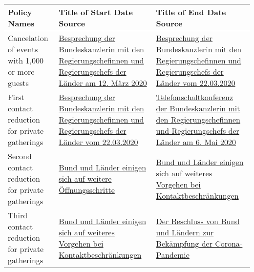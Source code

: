 \begin{table}[hbt!]
\centering
{
 \begin{tabular}{|| L | L | L ||}
 \hline
 \bf{Policy Names} &  \bf{Title of Start Date Source} &  \bf{Title of End Date Source} \\ [0.5ex]
 \hline\hline
 Cancelation of events with 1,000 or more guests & \href{https://www.bundesregierung.de/breg-de/themen/coronavirus/beschluss-zu-corona-1730292}{Besprechung der Bundeskanzlerin mit den Regierungschefinnen und Regierungschefs der Länder am 12. März 2020} & \href{https://www.bundesregierung.de/breg-de/themen/coronavirus/besprechung-der-bundeskanzlerin-mit-den-regierungschefinnen-und-regierungschefs-der-laender-vom-22-03-2020-1733248}{Besprechung der Bundeskanzlerin mit den Regierungschefinnen und Regierungschefs der Länder vom 22.03.2020}  \\

 First contact reduction for private gatherings & \href{https://www.bundesregierung.de/breg-de/themen/coronavirus/besprechung-der-bundeskanzlerin-mit-den-regierungschefinnen-und-regierungschefs-der-laender-vom-22-03-2020-1733248}{Besprechung der Bundeskanzlerin mit den Regierungschefinnen und Regierungschefs der Länder vom 22.03.2020} & \href{https://www.bundesregierung.de/resource/blob/992814/1750986/fc61b6eb1fc1d398d66cfea79b565129/2020-05-06-mpk-beschluss-data.pdf?download=1}{Telefonschaltkonferenz der Bundeskanzlerin mit den Regierungschefinnen und Regierungschefs der Länder am 6. Mai 2020}  \\

 Second contact reduction for private gatherings & \href{https://www.bundesregierung.de/breg-de/suche/bund-laender-beschluss-1750766}{Bund und Länder einigen sich auf weitere Öffnungsschritte} & \href{https://www.bundesregierung.de/breg-de/suche/bund-und-laender-einigen-sich-auf-weiteres-vorgehen-bei-kontaktbeschraenkungen-1755466}{Bund und Länder einigen sich auf weiteres Vorgehen bei Kontaktbeschränkungen}  \\

 Third contact reduction for private gatherings & \href{https://www.bundesregierung.de/breg-de/suche/bund-und-laender-einigen-sich-auf-weiteres-vorgehen-bei-kontaktbeschraenkungen-1755466}{Bund und Länder einigen sich auf weiteres Vorgehen bei Kontaktbeschränkungen}  & \href{https://www.bundesregierung.de/breg-de/suche/bund-laender-beschluss-1805264}{Der Beschluss von Bund und Ländern zur Bekämpfung der Corona-Pandemie}  \\


\end{tabular}}
\end{table}
